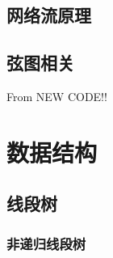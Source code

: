 \documentclass[a4paper]{article}
\begin{document}
\begin{multicols}{2}
			\subsection{网络流原理}
				

			\subsection{弦图相关}
				From NEW CODE!!
				



			





			

		\section{数据结构}

			\subsection{线段树}
				\subsubsection{非递归线段树}
					
				

\end{multicols}
\end{document}
